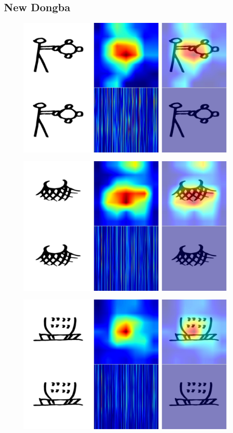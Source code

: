 \documentclass[11pt,a4paper,oneside]{report}
\begin{document}
\subsection{New Dongba}
 \begin{figure}[H]
    \centering
    \includegraphics[width=0.9\linewidth]{Visualizations/Grad-CAM/Naxi-Dongba/gradcam_dongba_E0F8_combined.pdf}
\end{figure}
 \begin{figure}[H]
    \centering
    \includegraphics[width=0.9\linewidth]{Visualizations/Grad-CAM/Naxi-Dongba/gradcam_dongba_E4C8_combined.pdf}
\end{figure}
 \begin{figure}[H]
    \centering
    \includegraphics[width=0.9\linewidth]{Visualizations/Grad-CAM/Naxi-Dongba/gradcam_dongba_E07D_combined.pdf}
\end{figure}
\end{document}
